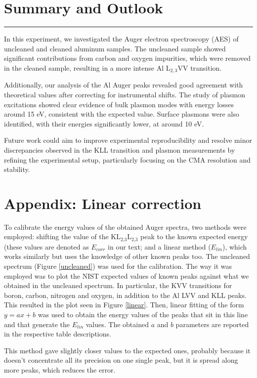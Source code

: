 \documentclass[12pt]{article}
\begin{document}
\section{Summary and Outlook}
\rule{\textwidth}{0.5pt}

In this experiment, we investigated the Auger electron spectroscopy (AES) of uncleaned and cleaned aluminum samples. The uncleaned sample showed significant contributions from carbon and oxygen impurities, which were removed in the cleaned sample, resulting in a more intense Al $\text{L}_{2,3}$VV transition.

Additionally, our analysis of the Al Auger peaks revealed good agreement with theoretical values after correcting for instrumental shifts. The study of plasmon excitations showed clear evidence of bulk plasmon modes with energy losses around 15 eV, consistent with the expected value. Surface plasmons were also identified, with their energies significantly lower, at around 10 eV.

Future work could aim to improve experimental reproducibility and resolve minor discrepancies observed in the KLL transition and plasmon measurements by refining the experimental setup, particularly focusing on the CMA resolution and stability.

\section{Appendix: Linear correction}
To calibrate the energy values of the obtained Auger spectra, two methods were employed: shifting the value of the $\text{K}\text{L}_{\text{2,3}}\text{L}_{\text{2,3}}$ peak to the known expected energy (these values are denoted as $E_{corr}$ in our text; and a linear method ($E_{lin}$), which works similarly but uses the knowledge of other known peaks too.
The uncleaned spectrum (Figure \ref{uncleaned}) was used for the calibration. The way it was employed was to plot the NIST expected values of known peaks against what we obtained in the uncleaned spectrum. In particular, the KVV transitions for boron, carbon, nitrogen and oxygen, in addition to the Al LVV and KLL peaks. This resulted in the plot seen in Figure \ref{linear}. Then, linear fitting of the form $y = ax + b$ was used to obtain the energy values of the peaks that sit in this line and that generate the $E_{lin}$ values. The obtained $a$ and $b$ parameters are reported in the respective table descriptions.

This method gave slightly closer values to the expected ones, probably because it doesn't concentrate all its precision on one single peak, but it is spread along more peaks, which reduces the error.
\end{document}
